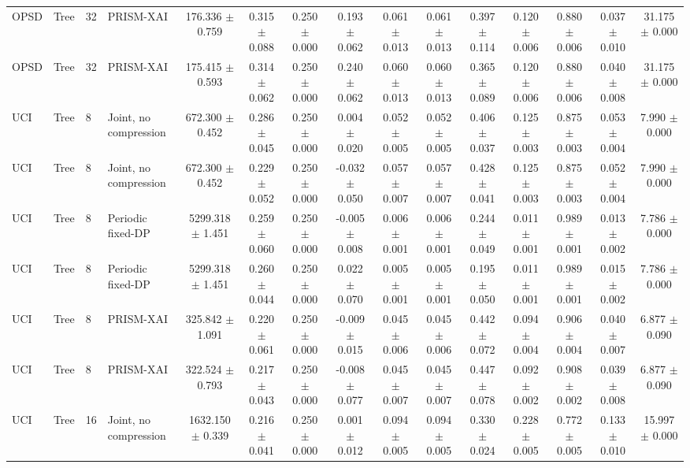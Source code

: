 \begin{table}[t]
\begin{tabular}{llllccccccccccc}
OPSD & Tree & 32 & PRISM-XAI & 176.336 $\pm$ 0.759 & 0.315 $\pm$ 0.088 & 0.250 $\pm$ 0.000 & 0.193 $\pm$ 0.062 & 0.061 $\pm$ 0.013 & 0.061 $\pm$ 0.013 & 0.397 $\pm$ 0.114 & 0.120 $\pm$ 0.006 & 0.880 $\pm$ 0.006 & 0.037 $\pm$ 0.010 & 31.175 $\pm$ 0.000 \\
OPSD & Tree & 32 & PRISM-XAI & 175.415 $\pm$ 0.593 & 0.314 $\pm$ 0.062 & 0.250 $\pm$ 0.000 & 0.240 $\pm$ 0.062 & 0.060 $\pm$ 0.013 & 0.060 $\pm$ 0.013 & 0.365 $\pm$ 0.089 & 0.120 $\pm$ 0.006 & 0.880 $\pm$ 0.006 & 0.040 $\pm$ 0.008 & 31.175 $\pm$ 0.000 \\
UCI & Tree & 8 & Joint, no compression & 672.300 $\pm$ 0.452 & 0.286 $\pm$ 0.045 & 0.250 $\pm$ 0.000 & 0.004 $\pm$ 0.020 & 0.052 $\pm$ 0.005 & 0.052 $\pm$ 0.005 & 0.406 $\pm$ 0.037 & 0.125 $\pm$ 0.003 & 0.875 $\pm$ 0.003 & 0.053 $\pm$ 0.004 & 7.990 $\pm$ 0.000 \\
UCI & Tree & 8 & Joint, no compression & 672.300 $\pm$ 0.452 & 0.229 $\pm$ 0.052 & 0.250 $\pm$ 0.000 & -0.032 $\pm$ 0.050 & 0.057 $\pm$ 0.007 & 0.057 $\pm$ 0.007 & 0.428 $\pm$ 0.041 & 0.125 $\pm$ 0.003 & 0.875 $\pm$ 0.003 & 0.052 $\pm$ 0.004 & 7.990 $\pm$ 0.000 \\
UCI & Tree & 8 & Periodic fixed-DP & 5299.318 $\pm$ 1.451 & 0.259 $\pm$ 0.060 & 0.250 $\pm$ 0.000 & -0.005 $\pm$ 0.008 & 0.006 $\pm$ 0.001 & 0.006 $\pm$ 0.001 & 0.244 $\pm$ 0.049 & 0.011 $\pm$ 0.001 & 0.989 $\pm$ 0.001 & 0.013 $\pm$ 0.002 & 7.786 $\pm$ 0.000 \\
UCI & Tree & 8 & Periodic fixed-DP & 5299.318 $\pm$ 1.451 & 0.260 $\pm$ 0.044 & 0.250 $\pm$ 0.000 & 0.022 $\pm$ 0.070 & 0.005 $\pm$ 0.001 & 0.005 $\pm$ 0.001 & 0.195 $\pm$ 0.050 & 0.011 $\pm$ 0.001 & 0.989 $\pm$ 0.001 & 0.015 $\pm$ 0.002 & 7.786 $\pm$ 0.000 \\
UCI & Tree & 8 & PRISM-XAI & 325.842 $\pm$ 1.091 & 0.220 $\pm$ 0.061 & 0.250 $\pm$ 0.000 & -0.009 $\pm$ 0.015 & 0.045 $\pm$ 0.006 & 0.045 $\pm$ 0.006 & 0.442 $\pm$ 0.072 & 0.094 $\pm$ 0.004 & 0.906 $\pm$ 0.004 & 0.040 $\pm$ 0.007 & 6.877 $\pm$ 0.090 \\
UCI & Tree & 8 & PRISM-XAI & 322.524 $\pm$ 0.793 & 0.217 $\pm$ 0.043 & 0.250 $\pm$ 0.000 & -0.008 $\pm$ 0.077 & 0.045 $\pm$ 0.007 & 0.045 $\pm$ 0.007 & 0.447 $\pm$ 0.078 & 0.092 $\pm$ 0.002 & 0.908 $\pm$ 0.002 & 0.039 $\pm$ 0.008 & 6.877 $\pm$ 0.090 \\
UCI & Tree & 16 & Joint, no compression & 1632.150 $\pm$ 0.339 & 0.216 $\pm$ 0.041 & 0.250 $\pm$ 0.000 & 0.001 $\pm$ 0.012 & 0.094 $\pm$ 0.005 & 0.094 $\pm$ 0.005 & 0.330 $\pm$ 0.024 & 0.228 $\pm$ 0.005 & 0.772 $\pm$ 0.005 & 0.133 $\pm$ 0.010 & 15.997 $\pm$ 0.000 \\

\end{tabular}
\end{table}
